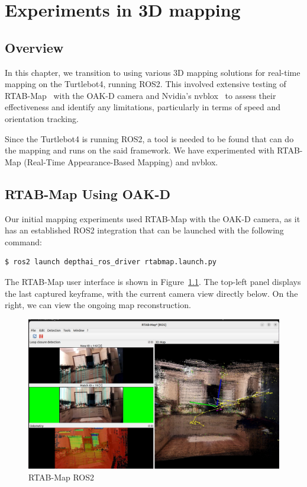 \chapter{Experiments in 3D mapping} \label{experiments_3d_mapping}

\section{Overview}

In this chapter, we transition to using various 3D mapping solutions for real-time mapping on the Turtlebot4, running ROS2. This involved extensive testing of RTAB-Map~\cite{RTAB_Map_docs} with the OAK-D camera and Nvidia's nvblox~\cite{nvblox_docs} to assess their effectiveness and identify any limitations, particularly in terms of speed and orientation tracking.

Since the Turtlebot4 is running ROS2, a tool is needed to be found that can do the mapping and runs on the said framework. We have experimented with RTAB-Map (Real-Time Appearance-Based Mapping) and nvblox.


\section{RTAB-Map Using OAK-D} \label{experiments_rtab_map}

Our initial mapping experiments used RTAB-Map with the OAK-D camera, as it has an established ROS2 integration that can be launched with the following command:

\FloatBarrier
\begin{lstlisting}[language=bash,frame=single,float=!ht]
$ ros2 launch depthai_ros_driver rtabmap.launch.py
\end{lstlisting}

The RTAB-Map user interface is shown in Figure~\ref{fig:rtabmap_ros}. The top-left panel displays the last captured keyframe, with the current camera view directly below. On the right, we can view the ongoing map reconstruction.

\begin{figure}[htbp]
	\centering
	\includegraphics[width=150mm, keepaspectratio]{figures_jpg/rtabmap_ros.jpg}
	\caption{RTAB-Map ROS2}
	\label{fig:rtabmap_ros}
\end{figure}

